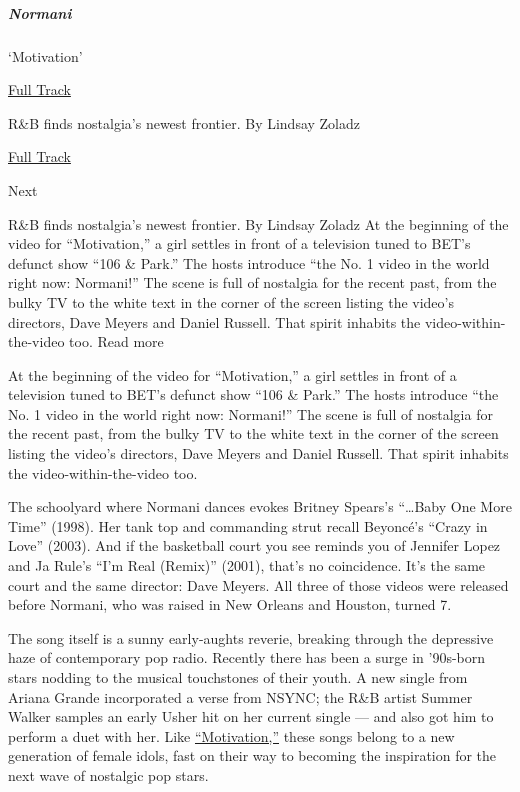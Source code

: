 \hypertarget{normani}{%
\subparagraph{Normani}\label{normani}}

`Motivation'

\href{https://open.spotify.com/track/0rIAC4PXANcKmitJfoqmVm?si=5VXVERD_QOaWBacH-5cgXQ}{
Full Track}

R\&B finds nostalgia's newest frontier. By Lindsay Zoladz

\href{https://open.spotify.com/track/0rIAC4PXANcKmitJfoqmVm?si=5VXVERD_QOaWBacH-5cgXQ}{Full
Track }

Next

R\&B finds nostalgia's newest frontier. By Lindsay Zoladz At the
beginning of the video for ``Motivation,'' a girl settles in front of a
television tuned to BET's defunct show ``106 \& Park.'' The hosts
introduce ``the No. 1 video in the world right now: Normani!'' The scene
is full of nostalgia for the recent past, from the bulky TV to the white
text in the corner of the screen listing the video's directors, Dave
Meyers and Daniel Russell. That spirit inhabits the
video-within-the-video too. Read more

At the beginning of the video for ``Motivation,'' a girl settles in
front of a television tuned to BET's defunct show ``106 \& Park.'' The
hosts introduce ``the No. 1 video in the world right now: Normani!'' The
scene is full of nostalgia for the recent past, from the bulky TV to the
white text in the corner of the screen listing the video's directors,
Dave Meyers and Daniel Russell. That spirit inhabits the
video-within-the-video too.

The schoolyard where Normani dances evokes Britney Spears's
``\ldots{}Baby One More Time'' (1998). Her tank top and commanding strut
recall Beyoncé's ``Crazy in Love'' (2003). And if the basketball court
you see reminds you of Jennifer Lopez and Ja Rule's ``I'm Real (Remix)''
(2001), that's no coincidence. It's the same court and the same
director: Dave Meyers. All three of those videos were released before
Normani, who was raised in New Orleans and Houston, turned 7.

The song itself is a sunny early-aughts reverie, breaking through the
depressive haze of contemporary pop radio. Recently there has been a
surge in '90s-born stars nodding to the musical touchstones of their
youth. A new single from Ariana Grande incorporated a verse from NSYNC;
the R\&B artist Summer Walker samples an early Usher hit on her current
single --- and also got him to perform a duet with her. Like
\href{https://www.youtube.com/watch?v=FKXSh14svlQ}{``Motivation,''}
these songs belong to a new generation of female idols, fast on their
way to becoming the inspiration for the next wave of nostalgic pop
stars.

